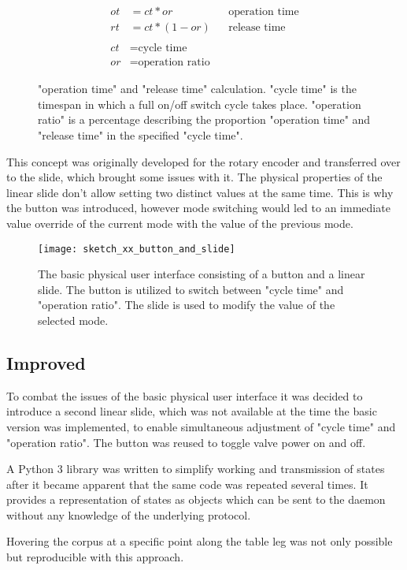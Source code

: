 \begin{figure}[h]
\begin{align*}
    ot &=ct * or && \text{operation time} \\
    rt &=ct * (1 - or) && \text{release time} \\ \\
    ct &= \text{cycle time} \\
    or &= \text{operation ratio}
\end{align*}
\caption{"operation time" and "release time" calculation. "cycle time" is the timespan in which a full on/off switch cycle takes place. "operation ratio" is a percentage describing the proportion "operation time" and "release time" in the specified "cycle time".}
\end{figure}

This concept was originally developed for the rotary encoder and transferred over to the slide, which brought some issues with it. The physical properties of the linear slide don't allow setting two distinct values at the same time. This is why the button was introduced, however mode switching would led to an immediate value override of the current mode with the value of the previous mode.

\begin{figure}[h]
\centering

\texttt{[image: sketch\_xx\_button\_and\_slide]}


\caption{The basic physical user interface consisting of a button and a linear slide. The button is utilized to switch between "cycle time" and "operation ratio". The slide is used to modify the value of the selected mode.}
\end{figure}

\subsection{Improved}
To combat the issues of the basic physical user interface it was decided to introduce a second linear slide, which was not available at the time the basic version was implemented, to enable simultaneous adjustment of "cycle time" and "operation ratio". The button was reused to toggle valve power on and off.

A Python 3 library was written to simplify working and transmission of states after it became apparent that the same code was repeated several times. It provides a representation of states as objects which can be sent to the daemon without any knowledge of the underlying protocol. 

Hovering the corpus at a specific point along the table leg was not only possible but reproducible with this approach.  